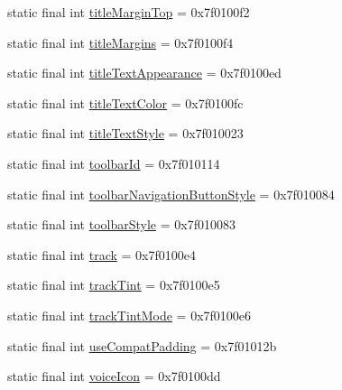 \begin{CompactItemize}
\item 
static final int \hyperlink{classandroid_1_1support_1_1graphics_1_1drawable_1_1animated_1_1_r_1_1attr_043d4f6aed2959f2a8f78d6a2f483721}{titleMarginTop} = 0x7f0100f2
\item 
static final int \hyperlink{classandroid_1_1support_1_1graphics_1_1drawable_1_1animated_1_1_r_1_1attr_02057117a470ff7259390d351cb8059c}{titleMargins} = 0x7f0100f4
\item 
static final int \hyperlink{classandroid_1_1support_1_1graphics_1_1drawable_1_1animated_1_1_r_1_1attr_16746e3d3d5502d1d4839a60f41d1546}{titleTextAppearance} = 0x7f0100ed
\item 
static final int \hyperlink{classandroid_1_1support_1_1graphics_1_1drawable_1_1animated_1_1_r_1_1attr_6c7e8199432bab366e783e786587f06e}{titleTextColor} = 0x7f0100fc
\item 
static final int \hyperlink{classandroid_1_1support_1_1graphics_1_1drawable_1_1animated_1_1_r_1_1attr_d94774ad8921aee75f19e0d3f418a1d0}{titleTextStyle} = 0x7f010023
\item 
static final int \hyperlink{classandroid_1_1support_1_1graphics_1_1drawable_1_1animated_1_1_r_1_1attr_6a382612301823d71a5c57b4c8ef3258}{toolbarId} = 0x7f010114
\item 
static final int \hyperlink{classandroid_1_1support_1_1graphics_1_1drawable_1_1animated_1_1_r_1_1attr_eada21113396ad844eeb961518ab16ac}{toolbarNavigationButtonStyle} = 0x7f010084
\item 
static final int \hyperlink{classandroid_1_1support_1_1graphics_1_1drawable_1_1animated_1_1_r_1_1attr_f1d6acf64a345e27c795aeadbe3a621e}{toolbarStyle} = 0x7f010083
\item 
static final int \hyperlink{classandroid_1_1support_1_1graphics_1_1drawable_1_1animated_1_1_r_1_1attr_eb8cb20acaee73b00936e2d41c0b8bb9}{track} = 0x7f0100e4
\item 
static final int \hyperlink{classandroid_1_1support_1_1graphics_1_1drawable_1_1animated_1_1_r_1_1attr_8f2494b5a04238a21e6062fc0ab5b72b}{trackTint} = 0x7f0100e5
\item 
static final int \hyperlink{classandroid_1_1support_1_1graphics_1_1drawable_1_1animated_1_1_r_1_1attr_40fccd28d0ddfd2c80868c87e83c655e}{trackTintMode} = 0x7f0100e6
\item 
static final int \hyperlink{classandroid_1_1support_1_1graphics_1_1drawable_1_1animated_1_1_r_1_1attr_79a62d68fa858301722872069b8872ee}{useCompatPadding} = 0x7f01012b
\item 
static final int \hyperlink{classandroid_1_1support_1_1graphics_1_1drawable_1_1animated_1_1_r_1_1attr_b70890b63b9726b4f4ed50d154841f83}{voiceIcon} = 0x7f0100dd

\end{CompactItemize}
